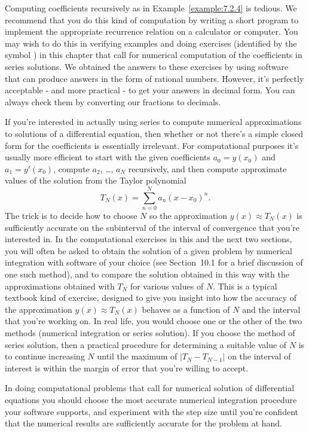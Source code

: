 \technology
\medskip

Computing coefficients recursively as in Example~\ref{example:7.2.4} is tedious. We recommend that
you do this kind of computation by writing a short program to implement the appropriate recurrence
relation on a calculator or computer. You may wish to do this in verifying examples and doing
exercises (identified by the symbol \Cex) in this chapter that call for numerical computation of the
coefficients in series solutions. We obtained the answers to these exercises by using software that
can produce answers in the form of rational numbers. However, it's perfectly acceptable - and more
practical - to get your answers in decimal form. You can always check them by converting our
fractions to decimals.

If you're interested in actually using series to compute numerical approximations to solutions of a
differential equation, then whether or not there's a simple closed form for the coefficients is
essentially irrelevant. For computational purposes it's usually more efficient to start with the
given coefficients $a_{0}=y(x_{0})$ and $a_{1}=y'(x_{0})$, compute $a_{2}$, \dots, $a_{N}$
recursively, and then compute approximate values of the solution from the Taylor polynomial
\[
  T_{N}(x)=\sum_{n=0}^{N}a_{n}(x-x_{0})^{n}.
\]
The trick is to decide how to choose $N$ so the approximation $y(x)\approx T_{N}(x)$ is sufficiently
accurate on the subinterval of the interval of convergence that you're interested in. In the
computational exercises in this and the next two sections, you will often be asked to obtain the
solution of a given problem by numerical integration with software of your choice (see Section~10.1
for a brief discussion of one such method), and to compare the solution obtained in this way with
the approximations obtained with $T_{N}$ for various values of $N$. This is a typical textbook kind
of exercise, designed to give you insight into how the accuracy of the approximation
$y(x)\approx T_{N}(x)$ behaves as a function of $N$ and the interval that you're working on. In real
life, you would choose one or the other of the two methods (numerical integration or series
solution). If you choose the method of series solution, then a practical procedure for determining a
suitable value of $N$ is to continue increasing $N$ until the maximum of $|T_{N}-T_{N-1}|$ on the
interval of interest is within the margin of error that you're willing to accept.

In doing computational problems that call for numerical solution of differential equations you
should choose the most accurate numerical integration procedure your software supports, and
experiment with the step size until you're confident that the numerical results are sufficiently
accurate for the problem at hand.

